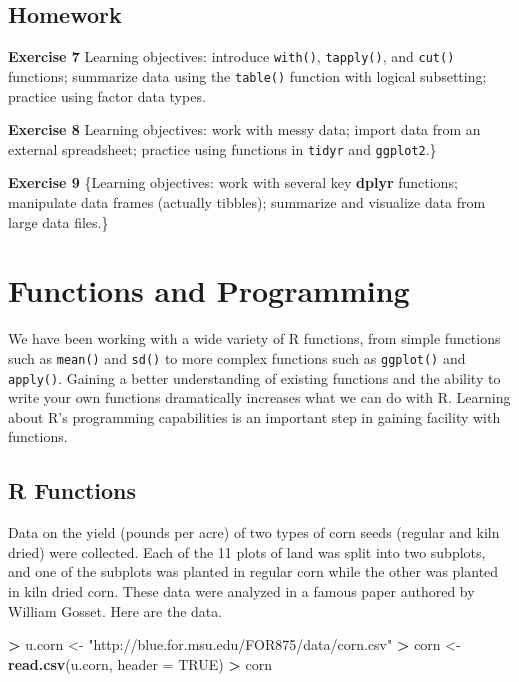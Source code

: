 \documentclass[]{krantz}
\makeatletter
\newenvironment{Shaded}{\begin{snugshade}}{\end{snugshade}}
\newcommand{\DataTypeTok}[1]{\textcolor[rgb]{0.27,0.27,0.27}{#1}}
\newcommand{\KeywordTok}[1]{\textcolor[rgb]{0.27,0.27,0.27}{\textbf{#1}}}
\newcommand{\NormalTok}[1]{#1}
\newcommand{\OperatorTok}[1]{\textcolor[rgb]{0.43,0.43,0.43}{\textbf{#1}}}
\newcommand{\OtherTok}[1]{\textcolor[rgb]{0.37,0.37,0.37}{#1}}
\newcommand{\StringTok}[1]{\textcolor[rgb]{0.5,0.5,0.5}{#1}}
\newenvironment{kframe}{%
\medskip{}
\setlength{\fboxsep}{.8em}
 \def\at@end@of@kframe{}%
 \ifinner\ifhmode%
  \def\at@end@of@kframe{\end{minipage}}%
  \begin{minipage}{\columnwidth}%
 \fi\fi%
 \def\FrameCommand##1{\hskip\@totalleftmargin \hskip-\fboxsep
 \colorbox{shadecolor}{##1}\hskip-\fboxsep
     \hskip-\linewidth \hskip-\@totalleftmargin \hskip\columnwidth}%
 \MakeFramed {\advance\hsize-\width
   \@totalleftmargin\z@ \linewidth\hsize
   \@setminipage}}%
 {\par\unskip\endMakeFramed%
 \at@end@of@kframe}
\renewenvironment{Shaded}{\begin{kframe}}{\end{kframe}}
\makeatother
\begin{document}
\hypertarget{homework-3}{%
\section{Homework}\label{homework-3}}

\textbf{Exercise 7} Learning objectives: introduce \texttt{with()}, \texttt{tapply()}, and \texttt{cut()} functions; summarize data using the \texttt{table()} function with logical subsetting; practice using factor data types.

\textbf{Exercise 8} Learning objectives: work with messy data; import data from an external spreadsheet; practice using functions in \texttt{tidyr} and \texttt{ggplot2}.\}

\textbf{Exercise 9} \{Learning objectives: work with several key \textbf{dplyr} functions; manipulate data frames (actually tibbles); summarize and visualize data from large data files.\}

\hypertarget{functions-and-programming}{%
\chapter{Functions and Programming}\label{functions-and-programming}}

We have been working with a wide variety of R functions, from simple functions such as \texttt{mean()} and \texttt{sd()} to more complex functions such as \texttt{ggplot()} and \texttt{apply()}. Gaining a better understanding of existing functions and the ability to write your own functions dramatically increases what we can do with R. Learning about R's programming capabilities is an important step in gaining facility with functions.

\hypertarget{r-functions}{%
\section{R Functions}\label{r-functions}}

Data on the yield (pounds per acre) of two types of corn seeds (regular and kiln dried) were collected. Each of the 11 plots of land was split into two subplots, and one of the subplots was planted in regular corn while the other was planted in kiln dried corn. These data were analyzed in a famous paper authored by William Gosset. Here are the data.

\begin{Shaded}
\begin{Highlighting}[]
\OperatorTok{>}\StringTok{ }\NormalTok{u.corn <-}\StringTok{ "http://blue.for.msu.edu/FOR875/data/corn.csv"}
\OperatorTok{>}\StringTok{ }\NormalTok{corn <-}\StringTok{ }\KeywordTok{read.csv}\NormalTok{(u.corn, }\DataTypeTok{header =} \OtherTok{TRUE}\NormalTok{)}
\OperatorTok{>}\StringTok{ }\NormalTok{corn}
\end{Highlighting}
\end{Shaded}
\end{document}
